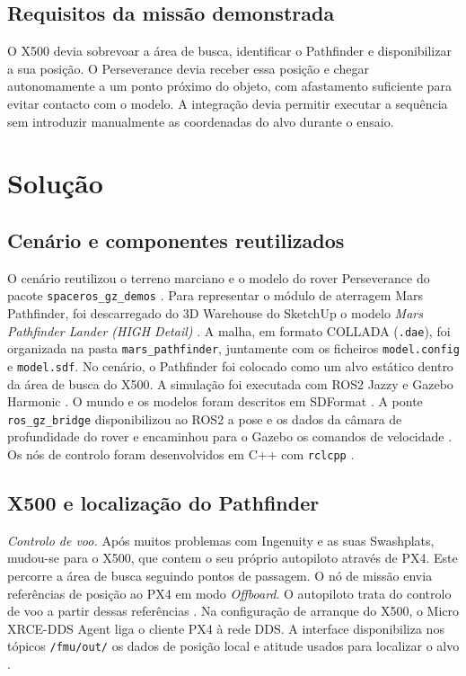 \documentclass[conference]{IEEEtran}
\begin{document}
\subsection{Requisitos da missão demonstrada}

O X500 devia sobrevoar a área de busca, identificar o Pathfinder e disponibilizar a sua posição. O Perseverance devia receber essa posição e chegar autonomamente a um ponto próximo do objeto, com afastamento suficiente para evitar contacto com o modelo. A integração devia permitir executar a sequência sem introduzir manualmente as coordenadas do alvo durante o ensaio.

\section{Solução}
\subsection{Cenário e componentes reutilizados}

O cenário reutilizou o terreno marciano e o modelo do rover Perseverance do pacote \texttt{spaceros\_gz\_demos} \cite{spaceros-demo}. Para representar o módulo de aterragem Mars Pathfinder, foi descarregado do 3D Warehouse do SketchUp o modelo \textit{Mars Pathfinder Lander (HIGH Detail)} \cite{pathfinder-mesh}. A malha, em formato COLLADA (\texttt{.dae}), foi organizada na pasta \texttt{mars\_pathfinder}, juntamente com os ficheiros \texttt{model.config} e \texttt{model.sdf}. No cenário, o Pathfinder foi colocado como um alvo estático dentro da área de busca do X500.
A simulação foi executada com ROS2 Jazzy e Gazebo Harmonic \cite{macenski2022,ros-jazzy,koenig2004,gazebo}. O mundo e os modelos foram descritos em SDFormat \cite{sdformat}. A ponte \texttt{ros\_gz\_bridge} disponibilizou ao ROS2 a pose e os dados da câmara de profundidade do rover e encaminhou para o Gazebo os comandos de velocidade \cite{bridge}. Os nós de controlo foram desenvolvidos em C++ com \texttt{rclcpp} \cite{rclcpp}.
\subsection{X500 e localização do Pathfinder}

\textit{Controlo de voo.}
Após muitos problemas com Ingenuity e as suas Swashplats, mudou-se para o X500, que contem o seu próprio autopiloto através de PX4. Este percorre a área de busca seguindo pontos de passagem. O nó de missão envia referências de posição ao PX4 em modo \textit{Offboard}. O autopiloto trata do controlo de voo a partir dessas referências \cite{px4-offboard}. Na configuração de arranque do X500, o Micro XRCE-DDS Agent liga o cliente PX4 à rede DDS. A interface disponibiliza nos tópicos \texttt{/fmu/out/} os dados de posição local e atitude usados para localizar o alvo \cite{px4-ros2,xrce-agent}.
\end{document}
